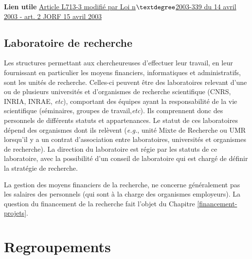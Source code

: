 \textbf{Lien utile\hspace{.5em}}
\href{https://www.legifrance.gouv.fr/codes/id/LEGISCTA000006182444}{Article L713-3 modifi\'e par Loi n$\textdegree$2003-339 du 14 avril 2003 - art. 2 JORF 15 avril 2003}

\subsection{Laboratoire de recherche}
Les structures permettant aux chercheur\mp euse\mp s d'effectuer leur travail, en leur fournissant en particulier les moyens financiers, informatiques et administratifs, sont les unit\'es de recherche. Celles-ci peuvent \^etre des laboratoires relevant d'une ou de plusieurs universit\'es et d'organismes de recherche scientifique (CNRS, INRIA, INRAE, {\em etc}), comportant des \'equipes ayant la responsabilit\'e de la vie scientifique (s\'eminaires, groupes de travail,{\em etc}). Ils comprennent donc des personnels de diff\'erents statuts et appartenances. Le statut de ces laboratoires d\'epend des organismes dont ils rel\`event ({\em e.g.}, unit\'e Mixte de Recherche ou UMR lorsqu'il y a un contrat d'association entre laboratoires, universit\'es et organismes de recherche). La direction du laboratoire est r\'egie par les statuts de ce laboratoire, avec la possibilit\'e d'un conseil de laboratoire qui est charg\'e de d\'efinir la strat\'egie de recherche.

La gestion des moyens financiers de la recherche, ne concerne g\'en\'eralement pas les salaires des personnels (qui sont \`a la charge des organismes employeurs). La question du financement de la recherche fait l'objet du Chapitre \ref{financement-projets}. 

\section{Regroupements}
\label{Regroupements}
